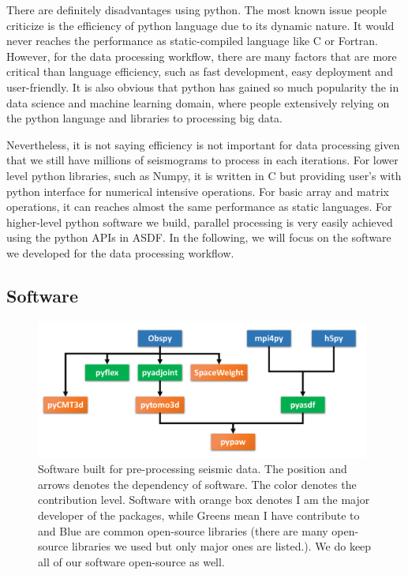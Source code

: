 There are definitely disadvantages using python. The most known issue people criticize is the
efficiency of python language due to its dynamic nature.
It would never reaches the performance
as static-compiled language like C or Fortran. However, for the data processing workflow,
there are many factors that are more critical than language efficiency, such as fast
development, easy deployment and user-friendly. It is also obvious that python
has gained so much popularity the in data science and machine learning domain, where
people extensively relying on the python language and libraries to processing big data.

Nevertheless, it is not saying efficiency is not important for data processing
given that we still have millions of seismograms to process in each iterations.
For lower level python libraries, such as Numpy, it is written in C but
providing user's with python interface for numerical intensive operations.
For basic array and matrix operations, it can reaches
almost the same performance as static languages. For higher-level python software
we build, parallel processing is very easily achieved using the python APIs in ASDF.
In the following, we will focus on the software we developed
 for the data processing workflow.

\subsection{Software}

\begin{figure}
  \centering
  \includegraphics[width=0.98\textwidth]{ch-tools/figures/data_processing_software.pdf}
  \caption[software built for pre-processing seismic data]
  {\small{Software built for pre-processing seismic data. The position and arrows denotes
  the dependency of software. The color denotes the contribution level. Software with
  orange box denotes I am the major developer of the packages, while Greens mean I have
  contribute to and Blue are common open-source libraries (there are many open-source
  libraries we used but only major ones are listed.). We do keep all of our software
  open-source as well.}}
  \label{fig:preprocess_software}
\end{figure}


